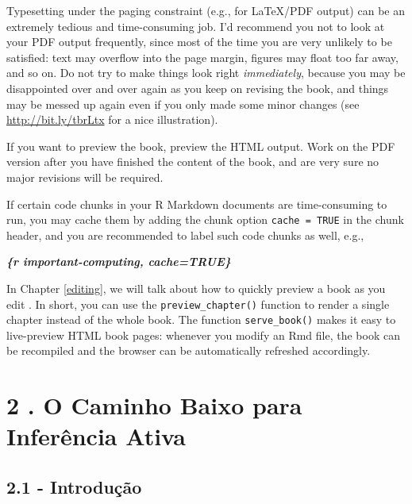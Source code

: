 \documentclass[
]{book}
\newenvironment{Shaded}{\begin{snugshade}}{\end{snugshade}}
\newcommand{\InformationTok}[1]{\textcolor[rgb]{0.56,0.35,0.01}{\textbf{\textit{#1}}}}
\begin{document}
Typesetting under the paging constraint (e.g., for LaTeX/PDF output) can be an extremely tedious and time-consuming job. I'd recommend you not to look at your PDF output frequently, since most of the time you are very unlikely to be satisfied: text may overflow into the page margin, figures may float too far away, and so on. Do not try to make things look right \emph{immediately}, because you may be disappointed over and over again as you keep on revising the book, and things may be messed up again even if you only made some minor changes (see \url{http://bit.ly/tbrLtx} for a nice illustration).

If you want to preview the book, preview the HTML output. Work on the PDF version after you have finished the content of the book, and are very sure no major revisions will be required.

If certain code chunks in your R Markdown documents are time-consuming to run, you may cache them by adding the chunk option \texttt{cache\ =\ TRUE} in the chunk header, and you are recommended to label such code chunks as well, e.g.,

\begin{Shaded}
\begin{Highlighting}[]
\InformationTok{\textasciigrave{}\textasciigrave{}\textasciigrave{}\{r important{-}computing, cache=TRUE\}}
\end{Highlighting}
\end{Shaded}

In Chapter \ref{editing}, we will talk about how to quickly preview a book as you edit . In short, you can use the \texttt{preview\_chapter()} function to render a single chapter instead of the whole book. The function \texttt{serve\_book()} makes it easy to live-preview HTML book pages: whenever you modify an Rmd file, the book can be recompiled and the browser can be automatically refreshed accordingly.

\hypertarget{o-caminho-baixo-para-inferuxeancia-ativa}{%
\chapter{2 . O Caminho Baixo para Inferência Ativa}\label{o-caminho-baixo-para-inferuxeancia-ativa}}

\hypertarget{introduuxe7uxe3o}{%
\section{2.1 - Introdução}\label{introduuxe7uxe3o}}
\end{document}
